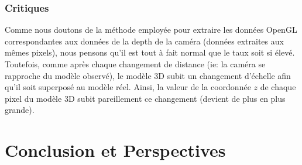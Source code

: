 \documentclass[a4paper, 12pt]{book}
\begin{document}
\subsection{Critiques}
Comme nous doutons de la méthode employée pour extraire les données OpenGL correspondantes aux données de la depth de la caméra (données extraites aux mêmes pixels), nous pensons qu'il est tout à fait normal que le taux soit si élevé. Toutefois, comme après chaque changement de distance (ie: la caméra se rapproche du modèle observé), le modèle 3D subit un changement d'échelle afin qu'il soit superposé au modèle réel. Ainsi, la valeur de la coordonnée $z$ de chaque pixel du modèle 3D subit pareillement ce changement (devient de plus en plus grande).



\chapter{Conclusion et Perspectives\label{chap-conclusion}}


\nocite{*}
%	
%
\printbibliography
\end{document}
